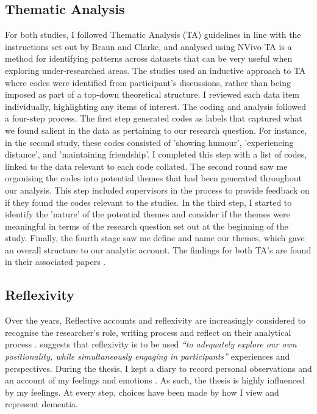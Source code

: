 \subsection{Thematic Analysis}
\label{CH4:TA}
For both studies, I followed Thematic Analysis (TA) guidelines in line with the instructions set out by Braun and Clarke, and analysed using NVivo \citep{braun_using_2006,braun_what_2014} TA is a method for identifying patterns across datasets that can be very useful when exploring under-researched areas. The studies used an inductive approach to TA where codes were identified from participant's discussions, rather than being imposed as part of a top-down theoretical structure. I reviewed each data item individually, highlighting any items of interest. The coding and analysis followed a four-step process. The first step generated codes as labels that captured what we found salient in the data as pertaining to our research question. For instance, in the second study, these codes consisted of 'showing humour', 'experiencing distance', and 'maintaining friendship'. I completed this step with a list of codes, linked to the data relevant to each code collated. The second round saw me organising the codes into potential themes that had been generated throughout our analysis. This step included supervisors in the process to provide feedback on if they found the codes relevant to the studies. In the third step, I started to identify the 'nature' of the potential themes and consider if the themes were meaningful in terms of the research question set out at the beginning of the study. Finally, the fourth stage saw me define and name our themes, which gave an overall structure to our analytic account. The findings for both TA's are found in their associated papers \citep{hodge_exploring_2018,hodge_exploring_2019}.

\subsection{Reflexivity}
\label{CH4:Reflexivity}
Over the years, Reflective accounts and reflexivity are increasingly considered to recognise the researcher's role, writing process and reflect on their analytical process \citep{balaam_emotion_2019}. \cite{everett2010lessons} suggests that reflexivity is to be used \textit{``to adequately explore our own positionality, while simultaneously engaging in participants''} \citep[pg. 165]{everett2010lessons}experiences and perspectives. During the thesis, I kept a diary to record personal observations and an account of my feelings and emotions \citep{glaze2002ph}. As such, the thesis is highly influenced by my feelings. At every step, choices have been made by how I view and represent dementia. 

